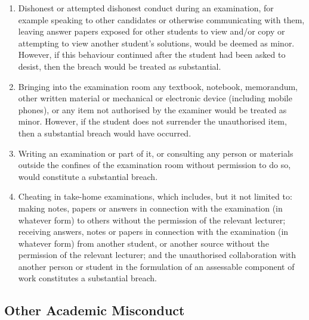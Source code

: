 \documentclass[a4paper,oneside]{book}
\begin{document}
\begin{enumerate}
\item  Dishonest or attempted dishonest conduct during an examination,
for example speaking to other candidates or otherwise communicating
with them, leaving answer papers exposed for other students to view
and/or copy or attempting to view another student's solutions, would
be deemed as minor.  However, if this behaviour continued after the
student had been asked to desist, then the breach would be treated as
substantial.

\item  Bringing into the examination room any textbook, notebook,
memorandum, other written material or mechanical or electronic device
(including mobile phones), or any item not authorised by the examiner
would be treated as minor.  However, if the student does not surrender
the unauthorised item, then a substantial breach would have occurred.

\item  Writing an examination or part of it, or consulting any person or
materials outside the confines of the examination room without
permission to do so, would constitute a substantial breach.

\item  Cheating in take-home examinations, which includes, but it not
limited to: making notes, papers or answers in connection with the
examination (in whatever form) to others without the permission of the
relevant lecturer; receiving answers, notes or papers in connection
with the examination (in whatever form) from another student, or
another source without the permission of the relevant lecturer; and
the unauthorised collaboration with another person or student in the
formulation of an assessable component of work constitutes a
substantial breach.
\end{enumerate}

\subsection*{Other Academic Misconduct}
\end{document}
